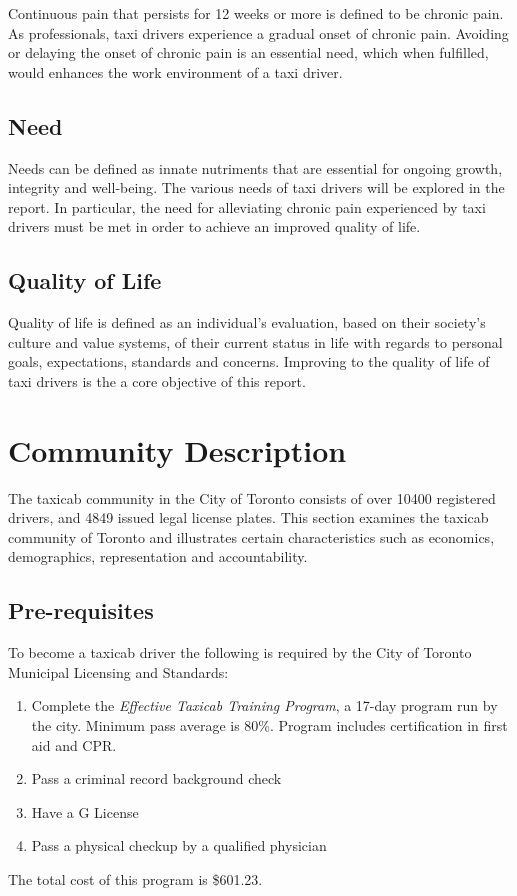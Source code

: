 \documentclass[11pt]{article}
\begin{document}
Continuous pain that persists for 12 weeks or more is defined to be
chronic pain. As professionals, taxi drivers experience a gradual 
onset of chronic pain. Avoiding or delaying the onset of chronic 
pain is an essential need, which when fulfilled, would enhances 
the work environment of a taxi driver.

\subsection{Need}
\label{sec:need}

Needs can be defined as innate nutriments that are essential for 
ongoing growth, integrity and well-being\cite{deci2000and}. The 
various needs of taxi drivers will be explored in the report. In 
particular, the need for alleviating chronic pain experienced by 
taxi drivers must be met in order to achieve an improved quality 
of life. 


\subsection{Quality of Life}
\label{sec:lifequal}

Quality of life is defined as an individual’s evaluation, based on
their society’s culture and value systems, of their current status in
life with regards to personal goals, expectations, standards and
concerns. Improving to the quality of life of taxi drivers is the
a core objective of this report.

\section{Community Description}
\label{sec:community}
The taxicab community in the City of Toronto consists of over 10400 
registered drivers, and 4849 issued legal license plates. This section 
examines the taxicab community of Toronto and illustrates certain 
characteristics such as economics, demographics, representation 
and accountability.

\subsection{Pre-requisites}
To become a taxicab driver the following is required by the City of Toronto Municipal Licensing and Standards:
\begin{enumerate}
\item Complete the \emph{Effective Taxicab Training Program}, a 17-day program run by the city. 
Minimum pass average is 80\%. Program includes certification in first aid and CPR.
\item Pass a criminal record background check
\item Have a G License
\item Pass a physical checkup by a qualified physician
\end{enumerate}
The total cost of this program is \$601.23\cite{MLS2013}.
\end{document}
